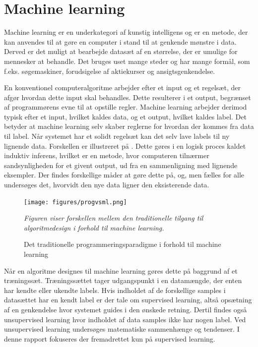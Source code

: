 \section{Machine learning}
Machine learning er en underkategori af kunstig intelligens og er en metode, der kan anvendes til at gøre en computer i stand til at genkende mønstre i data. Derved er det muligt at bearbejde datasæt af en størrelse, der er umulige for mennesker at behandle. Det bruges uset mange steder og har mange formål, som f.eks. søgemaskiner, forudsigelse af aktiekurser og ansigtsgenkendelse.\cite{DIKU2010}

En konventionel computeralgoritme arbejder efter et input og et regelsæt, der afgør hvordan dette input skal behandles. Dette resulterer i et output, begrænset af programmørens evne til at opstille regler. Machine learning arbejder derimod typisk efter et input, hvilket kaldes data, og et output, hvilket kaldes label. Det betyder at machine learning selv skaber reglerne for hvordan der kommes fra data til label. Når systemet har et solidt regelsæt kan det selv lave labels til ny lignende data. Forskellen er illustreret på . Dette gøres i en logisk proces kaldet induktiv inferens, hvilket er en metode, hvor computeren tilnærmer sandsynligheden for et givent output, ud fra en sammenligning med lignende eksempler. Der findes forskellige måder at gøre dette på, og, men fælles for alle undersøges det, hvorvidt den nye data ligner den eksisterende data.\cite{DIKU2010}

\begin{figure}[H]
	\centering
	\texttt{[image: figures/progvsml.png]}
	\flushleft 
	\caption{Det traditionelle programmeringsparadigme i forhold til machine learning}
	\label{progvsml}
	\flushleft
	\textit{Figuren viser forskellen mellem den traditionelle tilgang til algoritmedesign i forhold til machine learning.}
\end{figure}

Når en algoritme designes til machine learning gøres dette på baggrund af et træningssæt. \cite{DIKU2010} Træningssættet tager udgangspunkt i en datamængde, der enten har kendte eller ukendte labels. Hvis indholdet af de forskellige samples i datasættet har en kendt label er der tale om supervised learning, altså opsætning af en genkendelse hvor systemet guides i den ønskede retning. \cite{Brownlee2013} Dertil findes også unsupervised learning hvor indholdet af data samples ikke har nogen label. Ved unsupervised learning undersøges matematiske sammenhænge og tendenser. \cite{Brownlee2013} I denne rapport fokuseres der fremadrettet kun på supervised learning.

